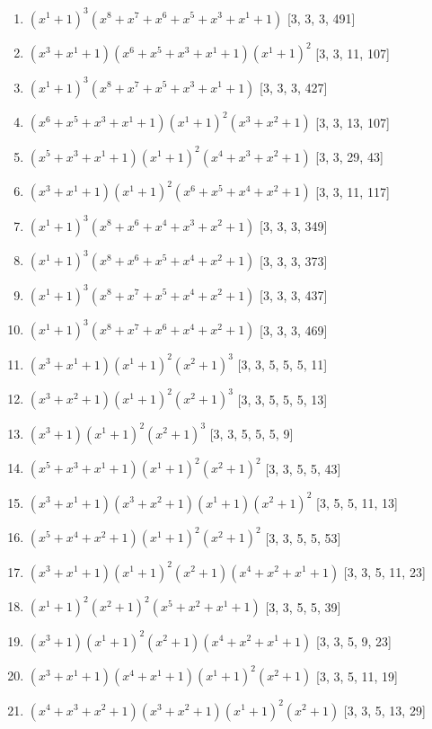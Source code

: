 \documentclass[10pt,twocolumn]{article}
\begin{document}
\begin{enumerate}
\item $(x^{1} + 1)^{3}(x^{8} + x^{7} + x^{6} + x^{5} + x^{3} + x^{1} + 1)$  [3, 3, 3, 491]
\item $(x^{3} + x^{1} + 1)(x^{6} + x^{5} + x^{3} + x^{1} + 1)(x^{1} + 1)^{2}$  [3, 3, 11, 107]
\item $(x^{1} + 1)^{3}(x^{8} + x^{7} + x^{5} + x^{3} + x^{1} + 1)$  [3, 3, 3, 427]
\item $(x^{6} + x^{5} + x^{3} + x^{1} + 1)(x^{1} + 1)^{2}(x^{3} + x^{2} + 1)$  [3, 3, 13, 107]
\item $(x^{5} + x^{3} + x^{1} + 1)(x^{1} + 1)^{2}(x^{4} + x^{3} + x^{2} + 1)$  [3, 3, 29, 43]
\item $(x^{3} + x^{1} + 1)(x^{1} + 1)^{2}(x^{6} + x^{5} + x^{4} + x^{2} + 1)$  [3, 3, 11, 117]
\item $(x^{1} + 1)^{3}(x^{8} + x^{6} + x^{4} + x^{3} + x^{2} + 1)$  [3, 3, 3, 349]
\item $(x^{1} + 1)^{3}(x^{8} + x^{6} + x^{5} + x^{4} + x^{2} + 1)$  [3, 3, 3, 373]
\item $(x^{1} + 1)^{3}(x^{8} + x^{7} + x^{5} + x^{4} + x^{2} + 1)$  [3, 3, 3, 437]
\item $(x^{1} + 1)^{3}(x^{8} + x^{7} + x^{6} + x^{4} + x^{2} + 1)$  [3, 3, 3, 469]
\item $(x^{3} + x^{1} + 1)(x^{1} + 1)^{2}(x^{2} + 1)^{3}$  [3, 3, 5, 5, 5, 11]
\item $(x^{3} + x^{2} + 1)(x^{1} + 1)^{2}(x^{2} + 1)^{3}$  [3, 3, 5, 5, 5, 13]
\item $(x^{3} + 1)(x^{1} + 1)^{2}(x^{2} + 1)^{3}$  [3, 3, 5, 5, 5, 9]
\item $(x^{5} + x^{3} + x^{1} + 1)(x^{1} + 1)^{2}(x^{2} + 1)^{2}$  [3, 3, 5, 5, 43]
\item $(x^{3} + x^{1} + 1)(x^{3} + x^{2} + 1)(x^{1} + 1)(x^{2} + 1)^{2}$  [3, 5, 5, 11, 13]
\item $(x^{5} + x^{4} + x^{2} + 1)(x^{1} + 1)^{2}(x^{2} + 1)^{2}$  [3, 3, 5, 5, 53]
\item $(x^{3} + x^{1} + 1)(x^{1} + 1)^{2}(x^{2} + 1)(x^{4} + x^{2} + x^{1} + 1)$  [3, 3, 5, 11, 23]
\item $(x^{1} + 1)^{2}(x^{2} + 1)^{2}(x^{5} + x^{2} + x^{1} + 1)$  [3, 3, 5, 5, 39]
\item $(x^{3} + 1)(x^{1} + 1)^{2}(x^{2} + 1)(x^{4} + x^{2} + x^{1} + 1)$  [3, 3, 5, 9, 23]
\item $(x^{3} + x^{1} + 1)(x^{4} + x^{1} + 1)(x^{1} + 1)^{2}(x^{2} + 1)$  [3, 3, 5, 11, 19]
\item $(x^{4} + x^{3} + x^{2} + 1)(x^{3} + x^{2} + 1)(x^{1} + 1)^{2}(x^{2} + 1)$  [3, 3, 5, 13, 29]

\end{enumerate}
\end{document}
